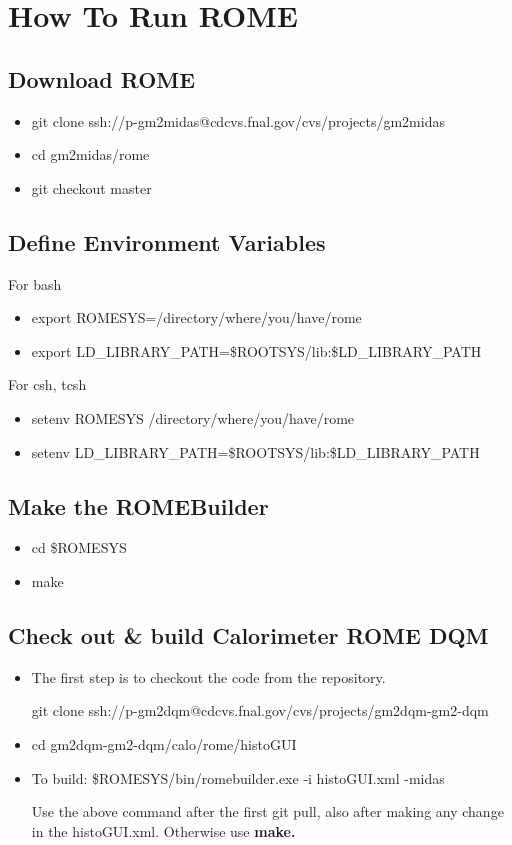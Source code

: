 

\section{How To Run ROME}

\subsection{Download ROME}
\begin{itemize}
\item git clone ssh://p-gm2midas@cdcvs.fnal.gov/cvs/projects/gm2midas
\item cd gm2midas/rome
\item  git checkout master
\end{itemize}

\subsection{Define Environment Variables}

For bash
\begin{itemize}
\item export ROMESYS=/directory/where/you/have/rome
\item export LD\_LIBRARY\_PATH=\$ROOTSYS/lib:\$LD\_LIBRARY\_PATH
\end{itemize}

For csh, tcsh
\begin{itemize}
\item setenv ROMESYS /directory/where/you/have/rome
\item setenv LD\_LIBRARY\_PATH=\$ROOTSYS/lib:\$LD\_LIBRARY\_PATH
\end{itemize}

\subsection{Make the ROMEBuilder}
\begin{itemize}
\item cd \$ROMESYS
\item make
\end{itemize}

\subsection{Check out \& build Calorimeter ROME DQM}
\begin{itemize}
\item The first step is to checkout the code from the repository. 

git clone ssh://p-gm2dqm@cdcvs.fnal.gov/cvs/projects/gm2dqm-gm2-dqm

\item cd gm2dqm-gm2-dqm/calo/rome/histoGUI

\item To build: \$ROMESYS/bin/romebuilder.exe -i histoGUI.xml -midas

Use the above command after the first git pull, also after making any change in the histoGUI.xml.
Otherwise use \bf{make}.

\end{itemize}

